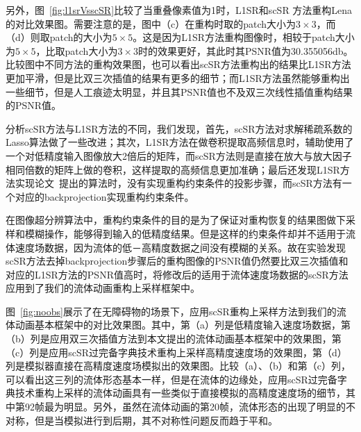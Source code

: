 另外，图~\ref{fig:l1srVsscSR}比较了当重叠像素值为1时，L1SR和scSR 方法重构Lena的对比效果图。需要注意的是，图中（c）在重构时取的patch大小为$3\times3$，而（d）则取patch的大小为$5\times5$。这是因为L1SR方法重构图像时，相较于patch大小为$5\times5$，比取patch大小为$3\times3$时的效果更好，其此时其PSNR值为30.355056db。比较图中不同方法的重构效果图，也可以看出scSR方法重构出的结果比L1SR方法更加平滑，但是比双三次插值的结果有更多的细节；而L1SR方法虽然能够重构出一些细节，但是人工痕迹太明显，并且其PSNR值也不及双三次线性插值重构结果的PSNR值。

分析scSR方法与L1SR方法的不同，我们发现，首先，scSR方法对求解稀疏系数的Lasso算法做了一些改进；其次，L1SR方法在做卷积提取高频信息时，辅助使用了一个对低精度输入图像放大2倍后的矩阵，而scSR方法则是直接在放大与放大因子相同倍数的矩阵上做的卷积，这样提取的高频信息更加准确；最后还发现L1SR方法实现论文~\cite{yang2008image}提出的算法时，没有实现重构约束条件的投影步骤，而scSR方法有一个对应的backprojection实现重构约束条件。

在图像超分辨算法中，重构约束条件的目的是为了保证对重构恢复的结果图做下采样和模糊操作，能够得到输入的低精度结果。但是这样的约束条件却并不适用于流体速度场数据，因为流体的低－高精度数据之间没有模糊的关系。故在实验发现scSR方法去掉backprojection步骤后的重构图像的PSNR值仍然要比双三次插值和对应的L1SR方法的PSNR值高时，将修改后的适用于流体速度场数据的scSR方法应用到了我们的流体动画重构上采样框架中。

图~\ref{fig:noobs}展示了在无障碍物的场景下，应用scSR重构上采样方法到我们的流体动画基本框架中的对比效果图。其中，第（a）列是低精度输入速度场数据，第（b）列是应用双三次插值方法到本文提出的流体动画基本框架中的效果图，第（c）列是应用scSR过完备字典技术重构上采样高精度速度场的效果图，第（d）列是模拟器直接在高精度速度场模拟出的效果图。比较（a）、（b）和第（c）列，可以看出这三列的流体形态基本一样，但是在流体的边缘处，应用scSR过完备字典技术重构上采样的流体动画具有一些类似于直接模拟的高精度速度场的细节，其中第92帧最为明显。另外，虽然在流体动画的第20帧，流体形态的出现了明显的不对称，但是当模拟进行到后期，其不对称性问题反而趋于平和。

